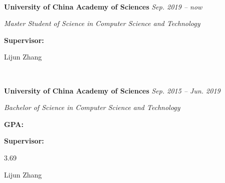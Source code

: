\documentclass[12pt,a4paper,utf8]{report}
\begin{document}
\vspace{0.2cm}\hspace{0.5cm}\
\begin{minipage}[t]{15.0cm}
    {{\textbf{University of China Academy of Sciences}}}\hfill
    {\em{Sep. 2019 -- now}}\par\vspace{0.1cm}
    {\qquad\em{Master Student of Science in Computer Science and Technology}}\par
\end{minipage}\par
\vspace{0.1cm}
    \begin{minipage}[t]{4cm}
        \qquad \textbf{Supervisor:}\par
    \end{minipage}
    \begin{minipage}[t]{11cm}
        Lijun Zhang\par
    \end{minipage}\par
\vspace{0.4cm}
\vspace{0.2cm}\hspace{0.5cm}\
\begin{minipage}[t]{15.0cm}
    {{\textbf{University of China Academy of Sciences}}}\hfill
    {\em{Sep. 2015 -- Jun. 2019}}\par\vspace{0.1cm}
    {\qquad\em{Bachelor of Science in Computer Science and Technology}}\par
\end{minipage}\par
\vspace{0.1cm}
    \begin{minipage}[t]{4cm}
        \qquad \textbf{GPA:}\par
        \qquad \textbf{Supervisor:}\par
    \end{minipage}
    \begin{minipage}[t]{11cm}
        3.69 \par
        Lijun Zhang\par
    \end{minipage}\par
\vspace{0.4cm}
\end{document}
